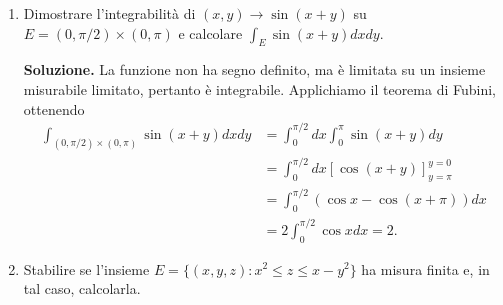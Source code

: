 \begin{enumerate}
		Si poteva anche ignorare la limitatezza della funzione $f$ su $E$ ed utilizzare il teorema di Tonelli:
		\[
		\begin{aligned}
			\int_E \sqrt{x^2 - z^2} |y \log y| dx dy dz &\leq 4 \int_{(0,2)^3} |\log y| dx dy dz \\
			&= 4 \int_0^2 dx \int_0^2 dz \int_0^2 |\log y| dy \\
			&= 16 \int_0^2 |\log y| dy < +\infty.
		\end{aligned}
		\]
		
		Concludiamo quindi che $f$ è integrabile su $E$. Per ottenere il valore del suo integrale, applichiamo il teorema di Fubini ed integriamo per parti:
		\[
		\begin{aligned}
			\int_E f &= \int_0^2 dx \int_0^x y \log y dy \int_0^x \sqrt{x^2 - z^2} dz \\
			&= \int_0^2 x^2 dx \int_0^x y \log y dy \int_0^1 \sqrt{1 - t^2} dt \\
			&= \frac{\pi}{4} \int_0^2 x^2 dx \int_0^x y \log y dy \\
			&= \frac{\pi}{4} \int_0^2 x^2 \left(\frac{x^2}{2} \log x - \int_0^x \frac{y}{2} dy\right) dx \\
			&= \frac{\pi}{8} \int_0^2 x^4 \log x dx - \frac{\pi}{16} \int_0^2 x^4 dx \\
			&= \frac{4\pi}{5} \left(\log 2 - \frac{7}{10}\right).
		\end{aligned}
		\]
	
	
	\item Dimostrare l'integrabilità di $(x,y) \to \sin(x + y)$ su $E = (0, \pi/2) \times (0, \pi)$ e calcolare $\int_E \sin(x + y) dx dy$.
	
	\textbf{Soluzione.}
		La funzione non ha segno definito, ma è limitata su un insieme misurabile limitato, pertanto è integrabile. Applichiamo il teorema di Fubini, ottenendo
		\[
		\begin{aligned}
			\int_{(0, \pi/2) \times (0, \pi)} \sin(x + y) dx dy &= \int_0^{\pi/2} dx \int_0^\pi \sin(x + y) dy \\
			&= \int_0^{\pi/2} dx \left[\cos(x + y)\right]_{y = \pi}^{y = 0} \\
			&= \int_0^{\pi/2} (\cos x - \cos(x + \pi)) dx \\
			&= 2 \int_0^{\pi/2} \cos x dx = 2.
		\end{aligned}
		\]
	
	
	\item Stabilire se l'insieme $E = \{(x,y,z) : x^2 \leq z \leq x - y^2\}$ ha misura finita e, in tal caso, calcolarla.
	

\end{enumerate}
